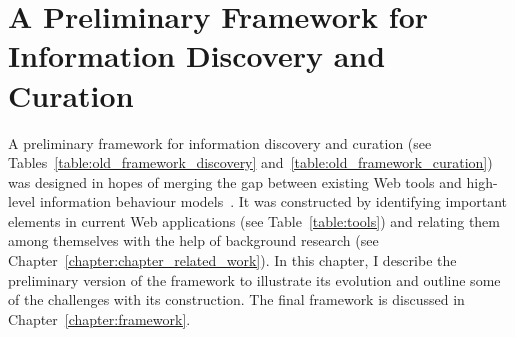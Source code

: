 \chapter{A Preliminary Framework for Information Discovery and Curation}
\label{chapter:old_framework}
A preliminary framework for information discovery and curation (see Tables~\ref{table:old_framework_discovery} and~\ref{table:old_framework_curation}) was designed in hopes of merging the gap between existing Web tools and high-level information behaviour models~\cite{voyloshnikova2014}. It was constructed by identifying important elements in current Web applications (see Table~\ref{table:tools}) and relating them among themselves with the help of background research (see Chapter~\ref{chapter:chapter_related_work}). In this chapter, I describe the preliminary version of the framework to illustrate its evolution and outline some of the challenges with its construction. The final framework is discussed in Chapter~\ref{chapter:framework}.

